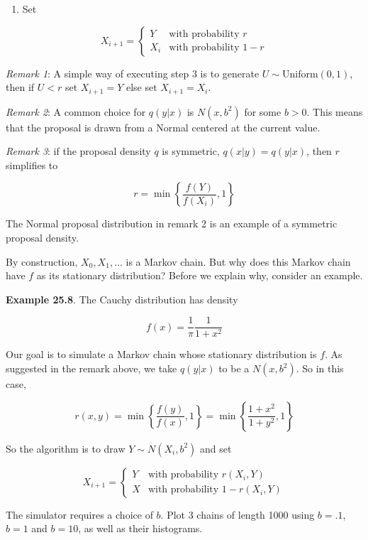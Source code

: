 \begin{enumerate}[tightlist,label={\arabic*.},resume]
\item
  Set
\end{enumerate}

\[
X_{i+1} = \begin{cases}
Y   &\text{with probability } r \\
X_{i} &\text{with probability } 1 - r 
\end{cases}
\]

\emph{Remark 1}: A simple way of executing step 3 is to generate
\(U \sim \text{Uniform}(0, 1)\), then if \(U < r\) set \(X_{i + 1} = Y\)
else set \(X_{i + 1} = X_{i}\).

\emph{Remark 2}: A common choice for \(q(y | x)\) is \(N(x, b^{2})\) for
some \(b > 0\). This means that the proposal is drawn from a Normal
centered at the current value.

\emph{Remark 3}: if the proposal density \(q\) is symmetric,
\(q(x | y) = q(y | x)\), then \(r\) simplifies to

\[ r = \min \left\{ \frac{f(Y)}{f(X_{i})}, 1\right\} \]

The Normal proposal distribution in remark 2 is an example of a
symmetric proposal density.

By construction, \(X_{0}, X_{1}, \dots\) is a Markov chain. But why does
this Markov chain have \(f\) as its stationary distribution? Before we
explain why, consider an example.

\textbf{Example 25.8}. The Cauchy distribution has density

\[ f(x) = \frac{1}{\pi} \frac{1}{1 + x^{2}} \]

Our goal is to simulate a Markov chain whose stationary distribution is
\(f\). As suggested in the remark above, we take \(q(y | x)\) to be a
\(N(x, b^{2})\). So in this case,

\[ r(x, y) = \min \left\{ \frac{f(y)}{f(x)}, 1 \right\} = \min \left\{ \frac{1 + x^{2}}{1 + y^{2}} , 1\right\} \]

So the algorithm is to draw \(Y \sim N(X_{i}, b^{2})\) and set

\[ 
X_{i + 1} = \begin{cases}
Y & \text{with probability } r(X_{i}, Y) \\
X & \text{with probability } 1 - r(X_{i}, Y)
\end{cases} 
\]

The simulator requires a choice of \(b\). Plot 3 chains of length
1000 using \(b = .1\), \(b = 1\) and \(b = 10\), as well as their
histograms.

